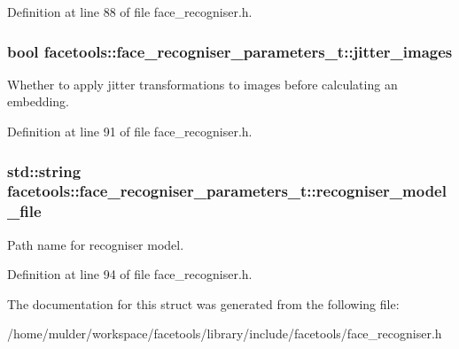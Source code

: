 Definition at line 88 of file face\+\_\+recogniser.\+h.

\subsubsection[{\texorpdfstring{jitter\+\_\+images}{jitter_images}}]{\setlength{\rightskip}{0pt plus 5cm}bool facetools\+::face\+\_\+recogniser\+\_\+parameters\+\_\+t\+::jitter\+\_\+images}\hypertarget{structfacetools_1_1face__recogniser__parameters__t_a75b4b4192940c2e633af4cb6601815a6}{}\label{structfacetools_1_1face__recogniser__parameters__t_a75b4b4192940c2e633af4cb6601815a6}
Whether to apply jitter transformations to images before calculating an embedding. 

Definition at line 91 of file face\+\_\+recogniser.\+h.

\subsubsection[{\texorpdfstring{recogniser\+\_\+model\+\_\+file}{recogniser_model_file}}]{\setlength{\rightskip}{0pt plus 5cm}std\+::string facetools\+::face\+\_\+recogniser\+\_\+parameters\+\_\+t\+::recogniser\+\_\+model\+\_\+file}\hypertarget{structfacetools_1_1face__recogniser__parameters__t_ae5889ff7e799b0f54777be3cb44a9b36}{}\label{structfacetools_1_1face__recogniser__parameters__t_ae5889ff7e799b0f54777be3cb44a9b36}
Path name for recogniser model. 

Definition at line 94 of file face\+\_\+recogniser.\+h.



The documentation for this struct was generated from the following file\+:\begin{DoxyCompactItemize}
\item 
/home/mulder/workspace/facetools/library/include/facetools/face\+\_\+recogniser.\+h\end{DoxyCompactItemize}
